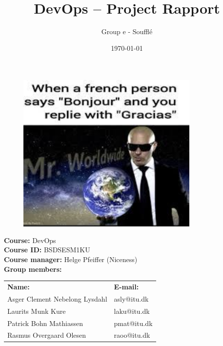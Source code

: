 \title{\textbf{DevOps – Project Rapport}}
\author{Group e - Soufflé}

\date{\today}

\maketitle

\begin{figure}[H]
    \centering
    \includegraphics[width = 9.0cm]{Report/Images/Screenshot 2023-05-09 at 11.25.08.png}
\end{figure}

\begin{center}
    \vspace{1cm}
    \textbf{Course:} DevOps \\
    \textbf{Course ID:} BSDSESM1KU \\
    \textbf{Course manager:} Helge Pfeiffer (Niceness)\\
    \vspace{1cm}
    \textbf{Group members: }
\end{center}

\begin{center}
\begin{tabular}{ m{20em}  m{10em} }
    \textbf{Name:} & \textbf{E-mail:}  \\
    Asger Clement Nebelong Lysdahl & asly@itu.dk \\
    Laurits Munk Kure & laku@itu.dk \\
    Patrick Bohn Mathiassen & pmat@itu.dk \\
    Rasmus Overgaard Olesen & raoo@itu.dk \\
\end{tabular}

\end{center}